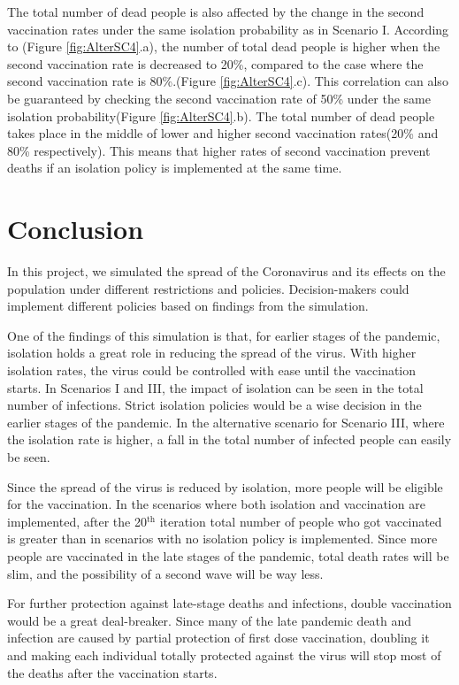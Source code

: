 \documentclass{article}
\begin{document}
The total number of dead people is also affected by the change in the second vaccination rates under the same isolation probability as in Scenario I. According to (Figure \ref{fig:AlterSC4}.a), the number of total dead people is higher when the second vaccination rate is decreased to 20\%, compared to the case where the second vaccination rate is 80\%.(Figure \ref{fig:AlterSC4}.c). This correlation can also be guaranteed by checking the second vaccination rate of 50\% under the same isolation probability(Figure \ref{fig:AlterSC4}.b). The total number of dead people takes place in the middle of lower and higher second vaccination rates(20\% and 80\% respectively). This means that higher rates of second vaccination prevent deaths if an isolation policy is implemented at the same time.
\newpage
{}
\section*{Conclusion}
\;\;\;\;\;\;In this project, we simulated the spread of the Coronavirus and its effects on the population under different restrictions and policies. Decision-makers could implement different policies based on findings from the simulation.

One of the findings of this simulation is that, for earlier stages of the pandemic, isolation holds a great role in reducing the spread of the virus. With higher isolation rates, the virus could be controlled with ease until the vaccination starts. In Scenarios I and III, the impact of isolation can be seen in the total number of infections. Strict isolation policies would be a wise decision in the earlier stages of the pandemic. In the alternative scenario for Scenario III, where the isolation rate is higher, a fall in the total number of infected people can easily be seen.

Since the spread of the virus is reduced by isolation, more people will be eligible for the vaccination. In the scenarios where both isolation and vaccination are implemented, after the 20$^{\textrm{th}}$ iteration total number of people who got vaccinated is greater than in scenarios with no isolation policy is implemented. Since more people are vaccinated in the late stages of the pandemic, total death rates will be slim, and the possibility of a second wave will be way less. 

For further protection against late-stage deaths and infections, double vaccination would be a great deal-breaker. Since many of the late pandemic death and infection are caused by partial protection of first dose vaccination, doubling it and making each individual totally protected against the virus will stop most of the deaths after the vaccination starts.
\end{document}
